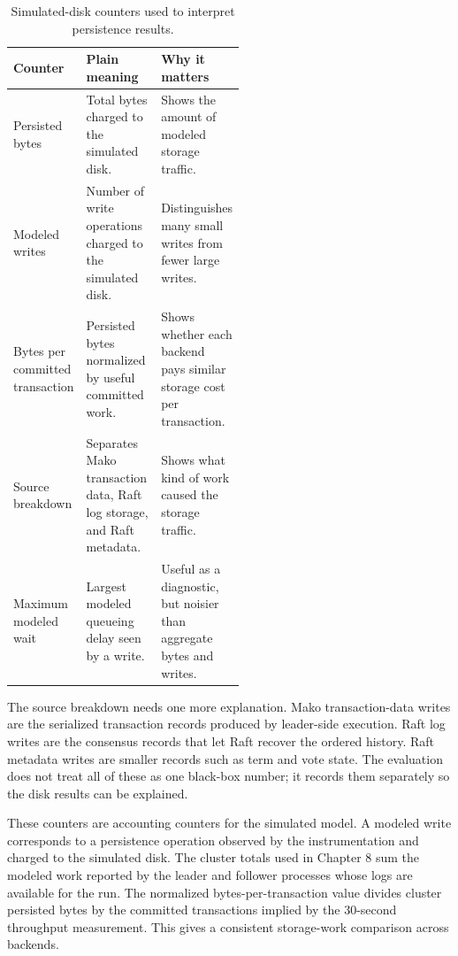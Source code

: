 \begin{table}[htbp]
\centering
\caption[Simulated-disk counters]{Simulated-disk counters used to interpret persistence results.}
\label{tab:simulated-disk-counters}
\small
\begin{tabularx}{\linewidth}{@{}>{\raggedright\arraybackslash}p{0.27\linewidth}
>{\raggedright\arraybackslash}X
>{\raggedright\arraybackslash}p{0.25\linewidth}@{}}
\toprule
\textbf{Counter} & \textbf{Plain meaning} & \textbf{Why it matters} \\
\midrule
Persisted bytes &
Total bytes charged to the simulated disk. &
Shows the amount of modeled storage traffic. \\
\addlinespace
Modeled writes &
Number of write operations charged to the simulated disk. &
Distinguishes many small writes from fewer large writes. \\
\addlinespace
Bytes per committed transaction &
Persisted bytes normalized by useful committed work. &
Shows whether each backend pays similar storage cost per transaction. \\
\addlinespace
Source breakdown &
Separates Mako transaction data, Raft log storage, and Raft metadata. &
Shows what kind of work caused the storage traffic. \\
\addlinespace
Maximum modeled wait &
Largest modeled queueing delay seen by a write. &
Useful as a diagnostic, but noisier than aggregate bytes and writes. \\
\bottomrule
\end{tabularx}
\end{table}
\FloatBarrier

The source breakdown needs one more explanation. Mako transaction-data writes
are the serialized transaction records produced by leader-side execution. Raft
log writes are the consensus records that let Raft recover the ordered history.
Raft metadata writes are smaller records such as term and vote state. The
evaluation does not treat all of these as one black-box number; it records them
separately so the disk results can be explained.

These counters are accounting counters for the simulated model. A modeled write
corresponds to a persistence operation observed by the instrumentation and
charged to the simulated disk. The cluster totals used in Chapter 8 sum the
modeled work reported by the leader and follower processes whose logs are
available for the run. The normalized bytes-per-transaction value divides
cluster persisted bytes by the committed transactions implied by the
30-second throughput measurement. This gives a consistent storage-work
comparison across backends.


